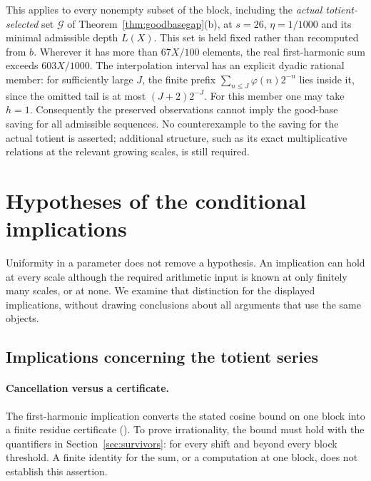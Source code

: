 \documentclass[11pt]{article}
\theoremstyle{plain}
\theoremstyle{definition}
\theoremstyle{remark}
\newcommand{\lean}[2]{\leanlink{#2}}
\begin{document}
This applies to every nonempty subset of the block, including the
\emph{actual totient-selected} set $\mathcal G$ of
Theorem~\ref{thm:goodbasegap}(b), at $s=26$, $\eta=1/1000$ and its
minimal admissible depth $L(X)$. This set is held fixed rather
than recomputed from $b$. Wherever it has more than $67X/100$
elements, the real first-harmonic sum exceeds $603X/1000$.
The interpolation interval has an explicit dyadic rational member: for
sufficiently large $J$, the finite prefix
$\sum_{n\le J}\varphi(n)2^{-n}$ lies inside it, since the omitted tail
is at most $(J+2)2^{-J}$. For this member one may take $h=1$.
Consequently the preserved observations cannot imply the good-base
saving for all admissible sequences. No counterexample to the saving
for the actual totient is asserted; additional structure, such as its
exact multiplicative relations at the relevant growing scales, is
still required.

\section{Hypotheses of the conditional implications}
\label{sec:promotion-audit}

Uniformity in a parameter does not remove a hypothesis. An implication
can hold at every scale although the required arithmetic input is known
at only finitely many scales, or at none. We examine that distinction
for the displayed implications, without drawing conclusions about all
arguments that use the same objects.

\subsection*{Implications concerning the totient series}

\paragraph{Cancellation versus a certificate.}
The first-harmonic implication converts the stated cosine bound on one
block into a finite residue certificate
(\lean{exists\_certifiedKill\_of\_first\_harmonic\_gap}{FirstHarmonicGap.lean:128}). To prove irrationality, the bound must hold with the
quantifiers in Section~\ref{sec:survivors}: for every shift and beyond
every block threshold. A finite identity for the sum, or a computation
at one block, does not establish this assertion.
\end{document}
